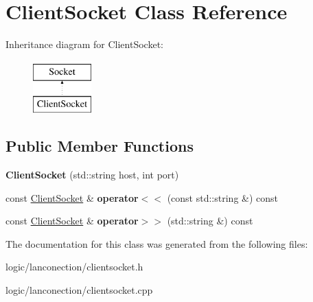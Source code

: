 \hypertarget{class_client_socket}{\section{Client\-Socket Class Reference}
\label{class_client_socket}
}
Inheritance diagram for Client\-Socket\-:\begin{figure}[H]
\begin{center}
\leavevmode
\includegraphics[height=2.000000cm]{class_client_socket}
\end{center}
\end{figure}
\subsection*{Public Member Functions}
\begin{DoxyCompactItemize}
\item 
\hypertarget{class_client_socket_a02809f0ffec549af450364df54175cce}{{\bfseries Client\-Socket} (std\-::string host, int port)}\label{class_client_socket_a02809f0ffec549af450364df54175cce}

\item 
\hypertarget{class_client_socket_a2fe5c2037ee6bdcc4d578db1111928ba}{const \hyperlink{class_client_socket}{Client\-Socket} \& {\bfseries operator$<$$<$} (const std\-::string \&) const }\label{class_client_socket_a2fe5c2037ee6bdcc4d578db1111928ba}

\item 
\hypertarget{class_client_socket_a6cb39e9222b501c8b070de60ef6b5fbc}{const \hyperlink{class_client_socket}{Client\-Socket} \& {\bfseries operator$>$$>$} (std\-::string \&) const }\label{class_client_socket_a6cb39e9222b501c8b070de60ef6b5fbc}

\end{DoxyCompactItemize}


The documentation for this class was generated from the following files\-:\begin{DoxyCompactItemize}
\item 
logic/lanconection/clientsocket.\-h\item 
logic/lanconection/clientsocket.\-cpp\end{DoxyCompactItemize}
